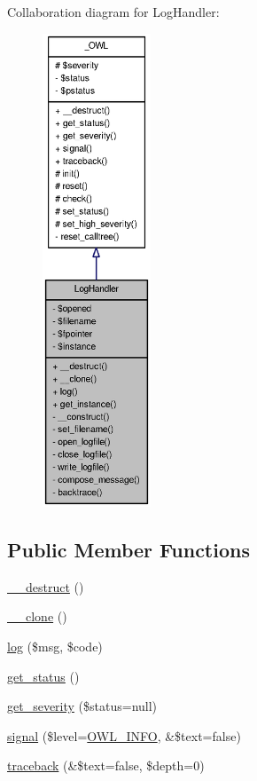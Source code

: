Collaboration diagram for LogHandler:\nopagebreak
\begin{figure}[H]
\begin{center}
\leavevmode
\includegraphics[height=400pt]{classLogHandler__coll__graph}
\end{center}
\end{figure}
\subsection*{Public Member Functions}
\begin{DoxyCompactItemize}
\item 
\hyperlink{classLogHandler_aacd0c653489cf221423b9edd62e81458}{\_\-\_\-destruct} ()
\item 
\hyperlink{classLogHandler_a395099dd9f1e9794bfe6a0c771991c3c}{\_\-\_\-clone} ()
\item 
\hyperlink{classLogHandler_a6d0139ed72f63093ca00f949ed5a73cb}{log} (\$msg, \$code)
\item 
\hyperlink{class__OWL_a99ec771fa2c5c279f80152cc09e489a8}{get\_\-status} ()
\item 
\hyperlink{class__OWL_adf9509ef96858be7bdd9414c5ef129aa}{get\_\-severity} (\$status=null)
\item 
\hyperlink{class__OWL_a51ba4a16409acf2a2f61f286939091a5}{signal} (\$level=\hyperlink{owl_8severitycodes_8php_a139328861128689f2f4def6a399d9057}{OWL\_\-INFO}, \&\$text=false)
\item 
\hyperlink{class__OWL_aa29547995d6741b7d2b90c1d4ea99a13}{traceback} (\&\$text=false, \$depth=0)
\end{DoxyCompactItemize}
